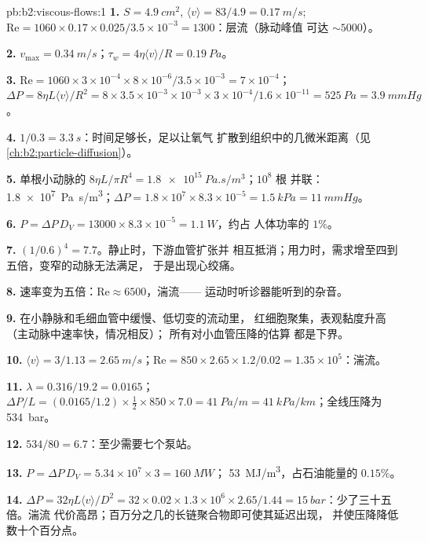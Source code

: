 \begin{solution}{pb:b2:viscous-flows:1}
\textbf{1.} $S = \qty{4.9}{cm^2}$, $\langle v\rangle = 83/4.9 = \qty{0.17}{m/s}$; $\mathrm{Re}
= 1060 \times 0.17 \times 0.025/3.5 \times 10^{-3} = 1300$：层流（脉动峰值
可达 $\sim 5000$）。

\textbf{2.} $v_{\max} = \qty{0.34}{m/s}$；$\tau_w = 4\eta\langle v\rangle/R = \qty{0.19}{Pa}$。

\textbf{3.} $\mathrm{Re} = 1060 \times 3 \times 10^{-4} \times 8 \times 10^{-6}/3.5 \times 10^{-3} =
7 \times 10^{-4}$；$\Delta P = 8\eta L\langle v\rangle/R^2 = 8 \times 3.5 \times 10^{-3} \times 10^{-3}
\times 3 \times 10^{-4}/1.6 \times 10^{-11} = \qty{525}{Pa} = \qty{3.9}{mmHg}$。

\textbf{4.} $1/0.3 = \qty{3.3}{s}$：时间足够长，足以让氧气
扩散到组织中的几微米距离（见\cref{ch:b2:particle-diffusion}）。

\textbf{5.} 单根小动脉的 $8\eta L/\pi R^4 = \qty{1.8e15}{Pa.s/m^3}$；$10^8$ 根
并联：\qty{1.8e7}{Pa.s/m^3}；$\Delta P = 1.8 \times 10^7 \times 8.3 \times 10^{-5} =
\qty{1.5}{kPa} = \qty{11}{mmHg}$。

\textbf{6.} $P = \Delta P\,D_V = 13000 \times 8.3 \times 10^{-5} = \qty{1.1}{W}$，约占
人体功率的 $1\%$。

\textbf{7.} $(1/0.6)^4 = 7.7$。静止时，下游血管扩张并
相互抵消；用力时，需求增至四到五倍，变窄的动脉无法满足，
于是出现心绞痛。

\textbf{8.} 速率变为五倍：$\mathrm{Re} \approx 6500$，湍流——
运动时听诊器能听到的杂音。

\textbf{9.} 在小静脉和毛细血管中缓慢、低切变的流动里，
红细胞聚集，表观黏度升高（主动脉中速率快，情况相反）；
所有对小血管压降的估算
都是下界。

\textbf{10.} $\langle v\rangle = 3/1.13 = \qty{2.65}{m/s}$；$\mathrm{Re} = 850 \times 2.65 \times
1.2/0.02 = 1.35 \times 10^5$：湍流。

\textbf{11.} $\lambda = 0.316/19.2 = 0.0165$；$\Delta P/L = (0.0165/1.2) \times \tfrac12 \times
850 \times 7.0 = \qty{41}{Pa/m} = \qty{41}{kPa/km}$；全线压降为 \qty{534}{bar}。

\textbf{12.} $534/80 = 6.7$：至少需要七个泵站。

\textbf{13.} $P = \Delta P\,D_V = 5.34 \times 10^7 \times 3 = \qty{160}{MW}$；
\qty{53}{MJ/m^3}，占石油能量的 $0.15\%$。

\textbf{14.} $\Delta P = 32\eta L\langle v\rangle/D^2 = 32 \times 0.02 \times 1.3 \times 10^6
\times 2.65/1.44 = \qty{15}{bar}$：少了三十五倍。湍流
代价高昂；百万分之几的长链聚合物即可使其延迟出现，
并使压降降低数十个百分点。


\end{solution}
